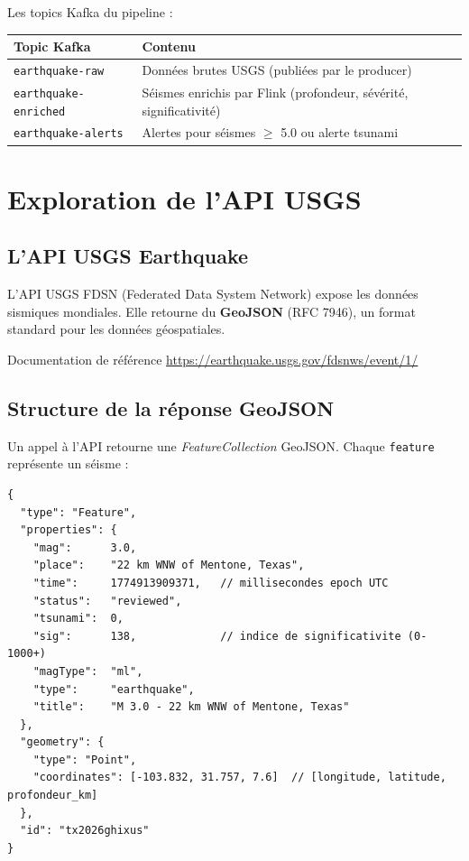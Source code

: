 \documentclass[12pt,a4paper]{article}
\begin{document}
Les topics Kafka du pipeline :

\begin{center}
\begin{tabularx}{\textwidth}{lX}
  \toprule
  \textbf{Topic Kafka} & \textbf{Contenu} \\
  \midrule
  \texttt{earthquake-raw}      & Données brutes USGS (publiées par le producer) \\
  \texttt{earthquake-enriched} & Séismes enrichis par Flink (profondeur, sévérité, significativité) \\
  \texttt{earthquake-alerts}   & Alertes pour séismes $\geq$ 5.0 ou alerte tsunami \\
  \bottomrule
\end{tabularx}
\end{center}

\newpage

\section{Exploration de l'API USGS}

\subsection{L'API USGS Earthquake}

L'API USGS FDSN (Federated Data System Network) expose les données sismiques mondiales.
Elle retourne du \textbf{GeoJSON} (RFC 7946), un format standard pour les données géospatiales.

\begin{infobox}{Documentation de référence}
  \url{https://earthquake.usgs.gov/fdsnws/event/1/}
\end{infobox}

\subsection{Structure de la réponse GeoJSON}

Un appel à l'API retourne une \textit{FeatureCollection} GeoJSON.
Chaque \texttt{feature} représente un séisme :

\begin{lstlisting}[style=json, caption={Structure d'un séisme GeoJSON}]
{
  "type": "Feature",
  "properties": {
    "mag":      3.0,
    "place":    "22 km WNW of Mentone, Texas",
    "time":     1774913909371,   // millisecondes epoch UTC
    "status":   "reviewed",
    "tsunami":  0,
    "sig":      138,             // indice de significativite (0-1000+)
    "magType":  "ml",
    "type":     "earthquake",
    "title":    "M 3.0 - 22 km WNW of Mentone, Texas"
  },
  "geometry": {
    "type": "Point",
    "coordinates": [-103.832, 31.757, 7.6]  // [longitude, latitude, profondeur_km]
  },
  "id": "tx2026ghixus"
}
\end{lstlisting}
\end{document}
